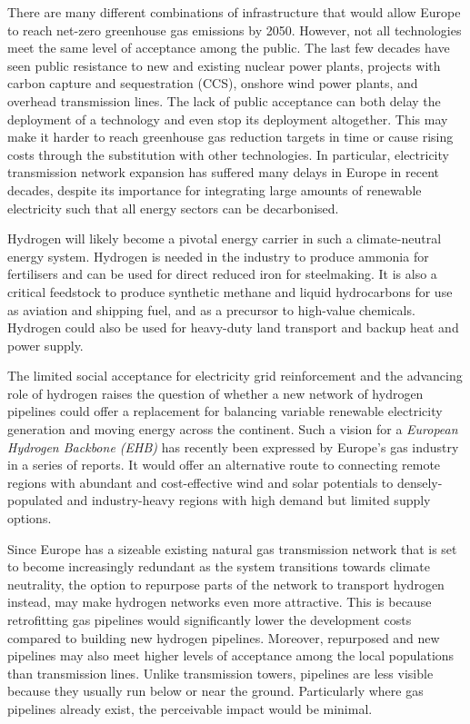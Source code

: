 There are many different combinations of infrastructure that would allow Europe
to reach net-zero greenhouse gas emissions by 2050. However, not all
technologies meet the same level of acceptance among the public. The last few
decades have seen public resistance to new and existing nuclear power plants,
projects with carbon capture and sequestration (CCS), onshore wind power plants,
and overhead transmission lines. The lack of public acceptance can both delay
the deployment of a technology and even stop its deployment altogether. This may
make it harder to reach greenhouse gas reduction targets in time or cause rising
costs through the substitution with other technologies. In particular,
electricity transmission network expansion has suffered many delays in Europe in
recent decades, despite its importance for integrating large amounts of
renewable electricity such that all energy sectors can be decarbonised.

Hydrogen will likely become a pivotal energy carrier in such a climate-neutral
energy system. Hydrogen is needed in the industry to produce ammonia for
fertilisers and can be used for direct reduced iron for steelmaking. It is also
a critical feedstock to produce synthetic methane and liquid hydrocarbons for
use as aviation and shipping fuel, and as a precursor to high-value chemicals. Hydrogen could
also be used for heavy-duty land transport and backup heat
and power supply.

The limited social acceptance for electricity grid reinforcement and the
advancing role of hydrogen raises the question of whether a new network of
hydrogen pipelines could offer a replacement for balancing variable renewable
electricity generation and moving energy across the continent. Such a vision for
a \textit{European Hydrogen Backbone (EHB)} has recently been expressed by
Europe's gas industry in a series of reports.
\cite{gasforclimateEuropeanHydrogen2020,gasforclimateEuropeanHydrogen2021,gasforclimateExtendingEuropean2021,gasforclimateEuropeanHydrogen2022}
It would offer an alternative route to connecting remote regions with abundant
and cost-effective wind and solar potentials to densely-populated and
industry-heavy regions with high demand but limited supply options.

Since Europe has a sizeable existing natural gas transmission network that is set to
become increasingly redundant as the system transitions towards climate
neutrality, the option to repurpose parts of the network to transport hydrogen
instead, may make hydrogen networks even more attractive. This is because
retrofitting gas pipelines would significantly lower the development costs
compared to building new hydrogen pipelines. Moreover, repurposed and new
pipelines may also meet higher levels of acceptance among the local populations
than transmission lines. Unlike transmission towers, pipelines are less visible
because they usually run below or near the ground. Particularly where gas
pipelines already exist, the perceivable impact would be minimal.

